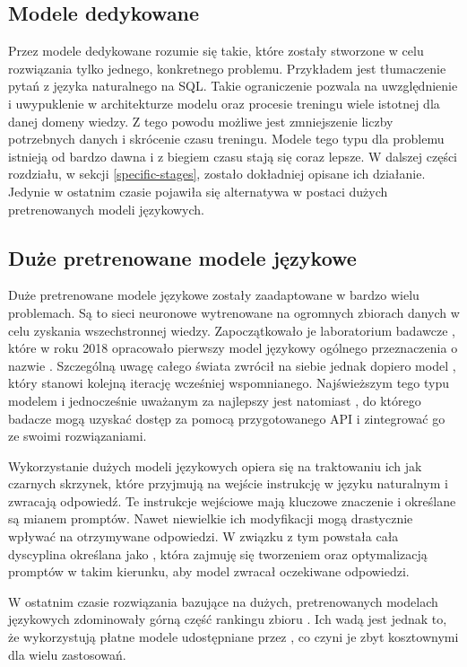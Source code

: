 \subsection{Modele dedykowane}
Przez modele dedykowane rozumie się takie, które zostały stworzone w celu rozwiązania tylko jednego, konkretnego problemu. Przykładem jest tłumaczenie pytań z języka naturalnego na SQL. Takie ograniczenie pozwala na uwzględnienie i uwypuklenie w architekturze modelu oraz procesie treningu wiele istotnej dla danej domeny wiedzy. Z tego powodu możliwe jest zmniejszenie liczby potrzebnych danych i skrócenie czasu treningu. Modele tego typu dla problemu  istnieją od bardzo dawna i z biegiem czasu stają się coraz lepsze. W dalszej części rozdziału, w sekcji \ref{specific-stages}, zostało dokładniej opisane ich działanie. Jedynie w ostatnim czasie pojawiła się alternatywa w postaci dużych pretrenowanych modeli językowych.

\subsection{Duże pretrenowane modele językowe}
Duże pretrenowane modele językowe zostały zaadaptowane w bardzo wielu problemach. Są to sieci neuronowe wytrenowane na ogromnych zbiorach danych w celu zyskania wszechstronnej wiedzy. Zapoczątkowało je laboratorium badawcze , które w roku 2018 opracowało pierwszy model językowy ogólnego przeznaczenia o nazwie  . Szczególną uwagę całego świata zwrócił na siebie jednak dopiero model , który stanowi kolejną iterację wcześniej wspomnianego. Najświeższym tego typu modelem i jednocześnie uważanym za najlepszy jest natomiast , do którego badacze mogą uzyskać dostęp za pomocą przygotowanego API i zintegrować go ze swoimi rozwiązaniami.

Wykorzystanie dużych modeli językowych opiera się na traktowaniu ich jak czarnych skrzynek, które przyjmują na wejście instrukcję w języku naturalnym i zwracają odpowiedź. Te instrukcje wejściowe mają kluczowe znaczenie i określane są mianem promptów. Nawet niewielkie ich modyfikacji mogą drastycznie wpływać na otrzymywane odpowiedzi. W związku z tym powstała cała dyscyplina określana jako , która zajmuję się tworzeniem oraz optymalizacją promptów w takim kierunku, aby model zwracał oczekiwane odpowiedzi.

W ostatnim czasie rozwiązania bazujące na dużych, pretrenowanych modelach językowych zdominowały górną część rankingu zbioru . Ich wadą jest jednak to, że wykorzystują płatne modele udostępniane przez , co czyni je zbyt kosztownymi dla wielu zastosowań.

